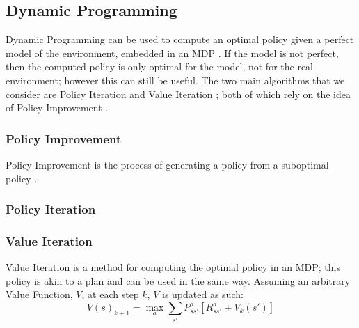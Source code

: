 \subsection{Dynamic Programming}
Dynamic Programming \cite{Bellman:1957, DBLP:books/lib/Bertsekas05} can be used to compute an optimal policy given a perfect model of the environment, embedded in an MDP \cite{Sutton1998}. If the model is not perfect, then the computed policy is only optimal for the model, not for the real environment; however this can still be useful. The two main algorithms that we consider are Policy Iteration \cite{Bellman:1957, howard:dp} and Value Iteration \cite{Bellman:1957}; both of which rely on the idea of Policy Improvement \cite{Bellman:1957}.
\subsubsection{Policy Improvement}
Policy Improvement \cite{Bellman:1957} is the process of generating a policy from a suboptimal policy \cite{DBLP:books/lib/Bertsekas05}.
\subsubsection{Policy Iteration}
\cite{Bellman:1957, howard:dp}
\subsubsection{Value Iteration}
Value Iteration is a method for computing the optimal policy in an MDP; this policy is akin to a plan and can be used in the same way. Assuming an arbitrary Value Function, $V$, at each step $k$, $V$ is updated as such:
$$V(s)_{k+1} = \max_a\sum_{s'}P_{ss'}^{a}[R_{ss'}^a+V_k(s')]$$
\cite{series/synthesis/2010Szepesvari}
